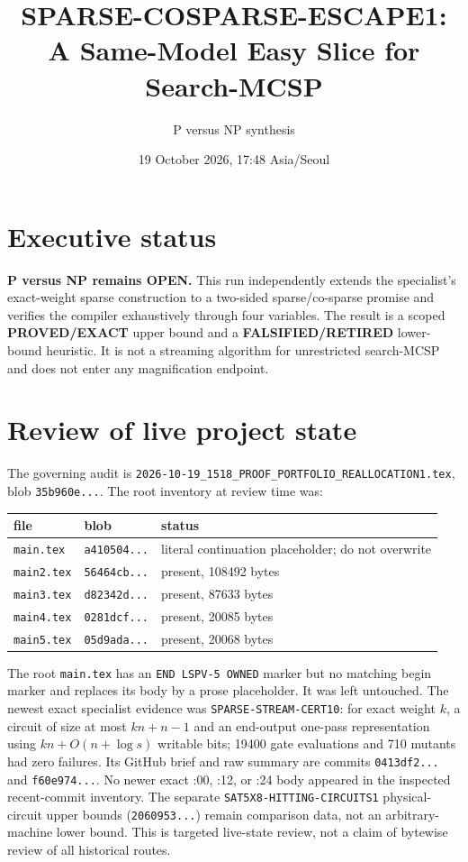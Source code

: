 \documentclass[11pt]{article}
\title{SPARSE-COSPARSE-ESCAPE1:\\A Same-Model Easy Slice for Search-MCSP}
\author{P versus NP synthesis}
\date{19 October 2026, 17:48 Asia/Seoul}
\begin{document}
\maketitle

\section*{Executive status}
\textbf{P versus NP remains OPEN.}  This run independently extends the
specialist's exact-weight sparse construction to a two-sided sparse/co-sparse
promise and verifies the compiler exhaustively through four variables.  The
result is a scoped \textbf{PROVED/EXACT} upper bound and a
\textbf{FALSIFIED/RETIRED} lower-bound heuristic.  It is not a streaming
algorithm for unrestricted search-MCSP and does not enter any magnification
endpoint.

\section*{Review of live project state}
The governing audit is
\texttt{2026-10-19\_1518\_PROOF\_PORTFOLIO\_REALLOCATION1.tex}, blob
\texttt{35b960e...}.  The root inventory at review time was:
\begin{center}
\begin{tabular}{lll}
\toprule
file & blob & status\\
\midrule
\texttt{main.tex} & \texttt{a410504...} & literal continuation placeholder; do not overwrite\\
\texttt{main2.tex} & \texttt{56464cb...} & present, 108492 bytes\\
\texttt{main3.tex} & \texttt{d82342d...} & present, 87633 bytes\\
\texttt{main4.tex} & \texttt{0281dcf...} & present, 20085 bytes\\
\texttt{main5.tex} & \texttt{05d9ada...} & present, 20068 bytes\\
\bottomrule
\end{tabular}
\end{center}
The root \texttt{main.tex} has an \texttt{END LSPV-5 OWNED} marker but no
matching begin marker and replaces its body by a prose placeholder.  It was
left untouched.  The newest exact specialist evidence was
\texttt{SPARSE-STREAM-CERT10}: for exact weight $k$, a circuit of size at most
$kn+n-1$ and an end-output one-pass representation using
$kn+O(n+\log s)$ writable bits; 19400 gate evaluations and 710 mutants had
zero failures.  Its GitHub brief and raw summary are commits
\texttt{0413df2...} and \texttt{f60e974...}.  No newer exact :00, :12, or :24
body appeared in the inspected recent-commit inventory.  The separate
\texttt{SAT5X8-HITTING-CIRCUITS1} physical-circuit upper bounds
(\texttt{2060953...}) remain comparison data, not an arbitrary-machine lower
bound.  This is targeted live-state review, not a claim of bytewise review of
all historical routes.
\end{document}
